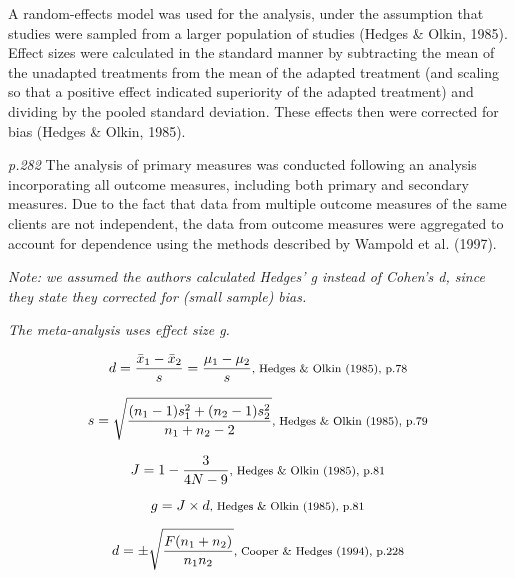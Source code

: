 \documentclass{article}
\begin{document}
A random-effects model was used for the analysis, under the assumption that studies were sampled from a larger population of studies (Hedges \& Olkin, 1985). Effect sizes were calculated in the standard manner by subtracting the mean of the unadapted treatments from the mean of the adapted treatment (and scaling so that a positive effect indicated superiority of the adapted treatment) and dividing by the pooled standard deviation. These effects then were corrected for bias (Hedges \& Olkin, 1985).

\textit{p.282} The analysis of primary measures was conducted following an analysis incorporating all outcome measures, including both primary and secondary measures. Due to the fact that data from multiple outcome measures of the same clients are not independent, the data from outcome measures were aggregated to account for dependence using the methods described by Wampold et al. (1997).

\vspace{3 mm}
\textit{Note: we assumed the authors calculated Hedges' g instead of Cohen's d, since they state they corrected for (small sample) bias.}

\vspace{3mm}
\textit{The meta-analysis uses effect size g.}

\begin{equation*}
d={\frac {{\bar {x}}_{1}-{\bar {x}}_{2}}{s}}={\frac {\mu_{1}-\mu_{2}}{s}}  \mbox {\footnotesize, Hedges \& Olkin (1985), p.78 } 
\end{equation*}

\begin{equation*}
s={\sqrt {\frac {(n_{1}-1)s_{1}^{2}+(n_{2}-1)s_{2}^{2}}{n_{1}+n_{2}-2}}} \mbox{\footnotesize, Hedges \& Olkin (1985), p.79 } 
\end{equation*}

\begin{equation*}
J={1-{\frac {3}{4N-9}}} \mbox{\footnotesize, Hedges \& Olkin (1985), p.81 }
\end{equation*} 

\begin{equation*}
g=J \times d \mbox{\footnotesize, Hedges \& Olkin (1985), p.81 } 
\end{equation*}

\begin{equation*}
d=\pm{\sqrt {\frac {F(n_{1}+n_{2})}{n_{1}n_{2}}}} \mbox{\footnotesize, Cooper \& Hedges (1994), p.228 }
\end{equation*}
\end{document}
